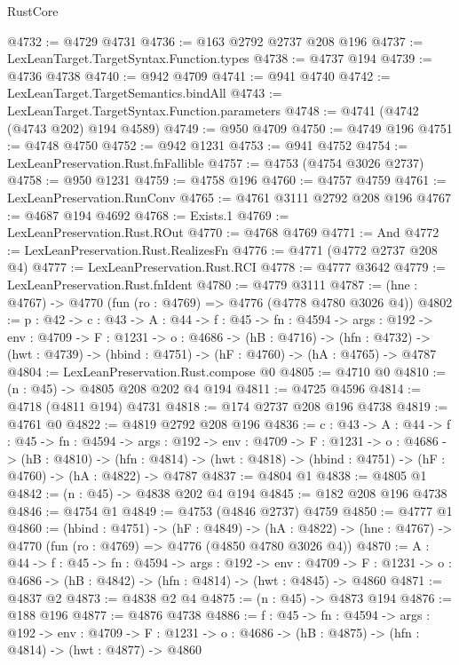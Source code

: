 \begin{lexlean}{RustCore}
\begin{coremodule}
@4732 := @4729 @4731
@4736 := @163 @2792 @2737 @208 @196
@4737 := LexLeanTarget.TargetSyntax.Function.types
@4738 := @4737 @194
@4739 := @4736 @4738
@4740 := @942 @4709
@4741 := @941 @4740
@4742 := LexLeanTarget.TargetSemantics.bindAll
@4743 := LexLeanTarget.TargetSyntax.Function.parameters
@4748 := @4741 (@4742 (@4743 @202) @194 @4589)
@4749 := @950 @4709
@4750 := @4749 @196
@4751 := @4748 @4750
@4752 := @942 @1231
@4753 := @941 @4752
@4754 := LexLeanPreservation.Rust.fnFallible
@4757 := @4753 (@4754 @3026 @2737)
@4758 := @950 @1231
@4759 := @4758 @196
@4760 := @4757 @4759
@4761 := LexLeanPreservation.RunConv
@4765 := @4761 @3111 @2792 @208 @196
@4767 := @4687 @194 @4692
@4768 := Exists.{1}
@4769 := LexLeanPreservation.Rust.ROut
@4770 := @4768 @4769
@4771 := And
@4772 := LexLeanPreservation.Rust.RealizesFn
@4776 := @4771 (@4772 @2737 @208 @4)
@4777 := LexLeanPreservation.Rust.RCI
@4778 := @4777 @3642
@4779 := LexLeanPreservation.Rust.fnIdent
@4780 := @4779 @3111
@4787 := (hne : @4767) -> @4770 (fun (ro : @4769) => @4776 (@4778 @4780 @3026 @4))
@4802 := {p : @42} ->
  {c : @43} ->
  {A : @44} ->
  {f : @45} ->
  {fn : @4594} ->
  {args : @192} ->
  {env : @4709} ->
  {F : @1231} ->
  {o : @4686} ->
  (hB : @4716) ->
  (hfn : @4732) -> (hwt : @4739) -> (hbind : @4751) -> (hF : @4760) -> (hA : @4765) -> @4787
@4804 := LexLeanPreservation.Rust.compose @0
@4805 := @4710 @0
@4810 := (n : @45) -> @4805 @208 @202 @4 @194
@4811 := @4725 @4596
@4814 := @4718 (@4811 @194) @4731
@4818 := @174 @2737 @208 @196 @4738
@4819 := @4761 @0
@4822 := @4819 @2792 @208 @196
@4836 := {c : @43} ->
  {A : @44} ->
  {f : @45} ->
  {fn : @4594} ->
  {args : @192} ->
  {env : @4709} ->
  {F : @1231} ->
  {o : @4686} ->
  (hB : @4810) ->
  (hfn : @4814) -> (hwt : @4818) -> (hbind : @4751) -> (hF : @4760) -> (hA : @4822) -> @4787
@4837 := @4804 @1
@4838 := @4805 @1
@4842 := (n : @45) -> @4838 @202 @4 @194
@4845 := @182 @208 @196 @4738
@4846 := @4754 @1
@4849 := @4753 (@4846 @2737) @4759
@4850 := @4777 @1
@4860 := (hbind : @4751) ->
  (hF : @4849) ->
  (hA : @4822) -> (hne : @4767) -> @4770 (fun (ro : @4769) => @4776 (@4850 @4780 @3026 @4))
@4870 := {A : @44} ->
  {f : @45} ->
  {fn : @4594} ->
  {args : @192} ->
  {env : @4709} ->
  {F : @1231} -> {o : @4686} -> (hB : @4842) -> (hfn : @4814) -> (hwt : @4845) -> @4860
@4871 := @4837 @2
@4873 := @4838 @2 @4
@4875 := (n : @45) -> @4873 @194
@4876 := @188 @196
@4877 := @4876 @4738
@4886 := {f : @45} ->
  {fn : @4594} ->
  {args : @192} ->
  {env : @4709} ->
  {F : @1231} -> {o : @4686} -> (hB : @4875) -> (hfn : @4814) -> (hwt : @4877) -> @4860

\end{coremodule}
\end{lexlean}

